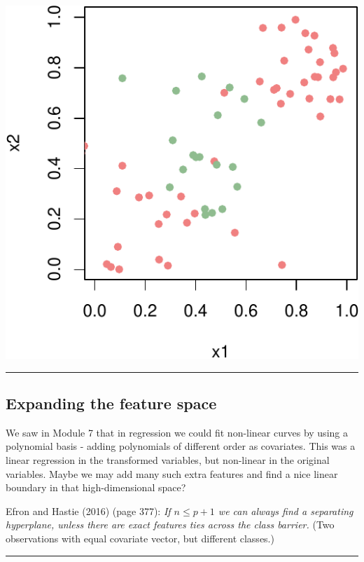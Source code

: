 \documentclass[]{article}
\begin{document}
\includegraphics{9SVM_files/figure-latex/unnamed-chunk-19-1.pdf}

\begin{center}\rule{0.5\linewidth}{\linethickness}\end{center}

\hypertarget{expanding-the-feature-space}{%
\subsection{Expanding the feature
space}\label{expanding-the-feature-space}}

We saw in Module 7 that in regression we could fit non-linear curves by
using a polynomial basis - adding polynomials of different order as
covariates. This was a linear regression in the transformed variables,
but non-linear in the original variables. Maybe we may add many such
extra features and find a nice linear boundary in that high-dimensional
space?

Efron and Hastie (2016) (page 377): \emph{If \(n \le p+1\) we can always
find a separating hyperplane, unless there are exact features ties
across the class barrier.} (Two observations with equal covariate
vector, but different classes.)

\begin{center}\rule{0.5\linewidth}{\linethickness}\end{center}
\end{document}
